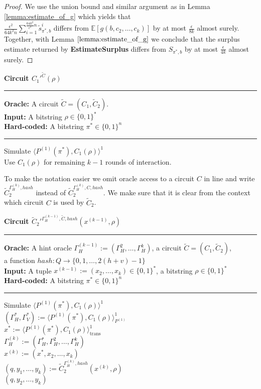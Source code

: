 \begin{proof}
We use the union bound and similar argument as in Lemma \ref{lemma:estimate_of_g}
which yields that \\$\frac{\epsilon^2}{64k^2n} \sum_{i=1}^{\frac{64k^2}{\epsilon^2}n} \widetilde{s}_{\pi^*,b}^i$ differs from
$\mathbb{E}[g(b, c_2, \dots, c_k)]$ by at most $\frac{\epsilon}{8k}$ almost surely. Together, with Lemma $\ref{lemma:estimate_of_g}$ we conclude that the surplus estimate
returned by \textbf{EstimateSurplus} differs from $S_{\pi^*,b}$ by at most $\frac{\epsilon}{4k}$ almost surely.
\end{proof}
%
%
\begin{codeblock}
  \textbf{Circuit $C_1'^{\widetilde{C}}(\rho)$}
  \medskip \hrule \medskip
  \textbf{Oracle:} A circuit $\widetilde{C} = (C_1, \widetilde{C}_2)$. \\
  \textbf{Input:}  A bitstring $\rho \in \{0,1\}^{*}$ \\
  \textbf{Hard-coded:} A bitstring $\pi^* \in \{0,1\}^{n}$
  \medskip\hrule\medskip
  Simulate $\langle P^{(1)}(\pi^*), C_1(\rho)\rangle^1$ \\
  Use $C_1(\rho)$ for remaining $k-1$ rounds of interaction.
\end{codeblock}
%
To make the notation easier we omit oracle access to a circuit $C$ in line and write
$\widetilde{C}_2^{\Gamma_H^{(k)}, hash}$ instead of $\widetilde{C}_2^{\Gamma_H^{(k)}, C, hash}$.
We make sure that it is clear from the context which circuit $C$ is used by $\widetilde{C}_2$.
%
\begin{codeblock}
  \textbf{Circuit $\widetilde{C}_2'^{\Gamma_H^{(k-1)}, \widetilde{C}, hash}(x^{(k-1)}, \rho)$}
  \medskip \hrule \medskip
  \textbf{Oracle:} A hint oracle $\Gamma_H^{(k-1)} := (\Gamma_H^{2}, \dots, \Gamma_H^{k})$, a circuit $\widetilde{C} = (C_1, \widetilde{C}_2)$, \\
  \IndII a function $hash: Q \rightarrow \{0,1,\dots, 2(h+v)-1\}$ \\
  \textbf{Input:}  A tuple $x^{(k-1)} := (x_2, \dots, x_{k}) \in \{0,1\}^{*}$, a bitstring $\rho \in \{0,1\}^{*}$\\
  \textbf{Hard-coded:} A bitstring $\pi^* \in \{0,1\}^{n}$
  \medskip\hrule\medskip
  Simulate $\langle P^{(1)}(\pi^*), C_1(\rho) \rangle^{1}$ \\
  \IndI $(\Gamma_H^*, \Gamma_V^*) := \langle P^{(1)}(\pi^*), C_1(\rho) \rangle^{1}_{P^{(1)}}$ \\
  \IndI $x^* := \langle P^{(1)}(\pi^*), C_1(\rho) \rangle^{1}_{\text{trans}}$ \\
  $\Gamma_H^{(k)} := (\Gamma_H^*, \Gamma_H^{2}, \dots, \Gamma_H^{k})$ \\
  $x^{(k)} := (x^*, x_2, \dots, x_{k})$ \\
  $(q, y_1, \dots, y_k) := \widetilde{C}_2^{\Gamma_H^{(k)}, hash}(x^{(k)}, \rho)$ \\
  \Return $(q, y_2, \dots, y_k)$
\end{codeblock}
